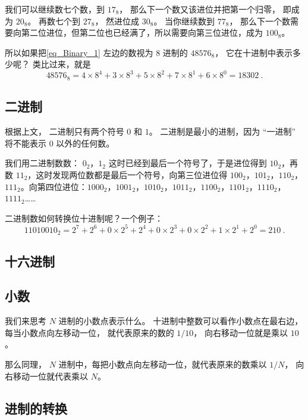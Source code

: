 我们可以继续数七个数，到 $17_\text{8}$， 那么下一个数又该进位并把第一个归零， 即成为 $20_\text{8}$。 再数七个到 $27_\text{8}$， 然进位成 $30_\text{8}$。 当你继续数到 $77_\text{8}$， 那么下一个数需要向第二位进位，但第二位也已经满了，所以需要向第三位进位，成为 $100_\text{8}$。

所以如果把\autoref{eq_Binary_1} 左边的数视为 $8$ 进制的 $48576_\text{8}$， 它在十进制中表示多少呢？ 类比过来，就是
\begin{equation}
48576_\text{8} = 4\times 8^{4} + 3\times 8^{3} + 5\times 8^{2} + 7\times 8^1 + 6\times 8^0 = 18302~.
\end{equation}

\subsection{二进制}
根据上文， 二进制只有两个符号 $0$ 和 $1$。 二进制是最小的进制，因为 “一进制” 将不能表示 $0$ 以外的任何数。

我们用二进制数数： $0_\text{2}$，$1_\text{2}$ 这时已经到最后一个符号了，于是进位得到 $10_\text{2}$，再数 $11_\text{2}$，这时发现两位数都是最后一个符号，向第三位进位得 $100_\text{2}$，$101_\text{2}$，$110_\text{2}$，$111_\text{2}$。向第四位进位：$1000_\text{2}$，$1001_\text{2}$，$1010_\text{2}$，$1011_\text{2}$，$1100_\text{2}$，$1101_\text{2}$，$1110_\text{2}$，$1111_\text{2}$……

二进制数如何转换位十进制呢？一个例子：
\begin{equation}
11010010_\text{2} = 2^7 + 2^6 + 0\times 2^5 + 2^4 + 0\times 2^3 + 0 \times 2^2 + 1\times 2^1 + 2^0 = 210~.
\end{equation}


\subsection{十六进制}

\subsection{小数}
我们来思考 $N$ 进制的小数点表示什么。 十进制中整数可以看作小数点在最右边， 每当小数点向左移动一位， 就代表原来的数的 $1/10$， 向右移动一位就是乘以 $10$。

那么同理， $N$ 进制中，每把小数点向左移动一位，就代表原来的数乘以 $1/N$， 向右移动一位就代表乘以 $N$。

\subsection{进制的转换}

